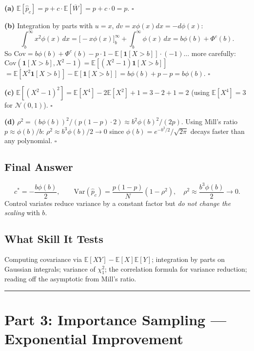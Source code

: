 \documentclass[12pt]{article}
\begin{document}
\textbf{(a)} $\mathbb{E}[\hat{p}_c] = p + c \cdot \mathbb{E}[\overline{W}] = p + c \cdot 0 = p$. \quad $\square$

\textbf{(b)} Integration by parts with $u = x$, $dv = x\phi(x)dx = -d\phi(x)$:
\[
  \int_b^\infty x^2\phi(x)\,dx
  = \bigl[-x\phi(x)\bigr]_b^\infty + \int_b^\infty \phi(x)\,dx
  = b\phi(b) + \Phi^c(b).
\]
So $\mathrm{Cov} = b\phi(b) + \Phi^c(b) - p \cdot 1 - \mathbb{E}[\mathbf{1}[X>b]]\cdot(-1)$...
more carefully: $\mathrm{Cov}(\mathbf{1}[X>b],X^2-1) = \mathbb{E}[(X^2-1)\mathbf{1}[X>b]]$
$= \mathbb{E}[X^2\mathbf{1}[X>b]] - \mathbb{E}[\mathbf{1}[X>b]] = b\phi(b) + p - p = b\phi(b)$. \quad $\square$

\textbf{(c)} $\mathbb{E}[(X^2-1)^2] = \mathbb{E}[X^4] - 2\mathbb{E}[X^2] + 1 = 3 - 2 + 1 = 2$
(using $\mathbb{E}[X^4] = 3$ for $\mathcal{N}(0,1)$). \quad $\square$

\textbf{(d)} $\rho^2 = (b\phi(b))^2/(p(1-p)\cdot 2) \approx b^2\phi(b)^2/(2p)$.
Using Mill's ratio $p \approx \phi(b)/b$: $\rho^2 \approx b^3\phi(b)/2 \to 0$
since $\phi(b) = e^{-b^2/2}/\sqrt{2\pi}$ decays faster than any polynomial. \quad $\square$

\subsection*{Final Answer}
\[
  c^* = -\frac{b\phi(b)}{2}, \qquad
  \mathrm{Var}(\hat{p}_c) = \frac{p(1-p)}{N}(1 - \rho^2), \quad \rho^2 \approx \frac{b^3\phi(b)}{2} \to 0.
\]
Control variates reduce variance by a constant factor but \emph{do not change the scaling} with $b$.

\subsection*{What Skill It Tests}
Computing covariance via $\mathbb{E}[XY] - \mathbb{E}[X]\mathbb{E}[Y]$; integration by parts on Gaussian integrals;
variance of $\chi^2_1$; the correlation formula for variance reduction;
reading off the asymptotic from Mill's ratio.

\bigskip\hrule\bigskip

\section*{\textcolor{sectionblue}{Part 3: Importance Sampling --- Exponential Improvement}}
\end{document}
